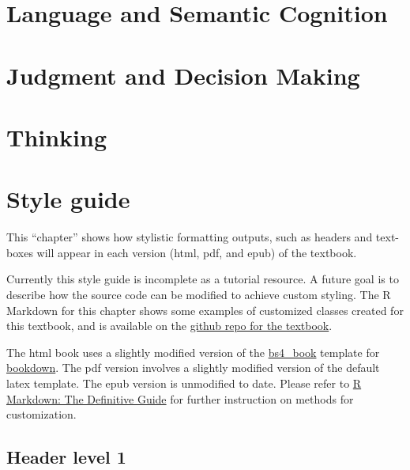 \documentclass[
  oneside,
  12pt]{crumpbook}
\begin{document}
\hypertarget{language-and-semantic-cognition}{%
\chapter{Language and Semantic Cognition}\label{language-and-semantic-cognition}}

\hypertarget{judgment-and-decision-making}{%
\chapter{Judgment and Decision Making}\label{judgment-and-decision-making}}

\hypertarget{thinking}{%
\chapter{Thinking}\label{thinking}}

\hypertarget{style-guide}{%
\chapter*{Style guide}\label{style-guide}}

This ``chapter'' shows how stylistic formatting outputs, such as headers and text-boxes will appear in each version (html, pdf, and epub) of the textbook.

Currently this style guide is incomplete as a tutorial resource. A future goal is to describe how the source code can be modified to achieve custom styling. The R Markdown for this chapter shows some examples of customized classes created for this textbook, and is available on the \href{https://github.com/CrumpLab/cognition/blob/main/textbook/Style_guide.Rmd}{github repo for the textbook}.

The html book uses a slightly modified version of the \href{https://pkgs.rstudio.com/bookdown/reference/bs4_book.html}{bs4\_book} template for \href{https://pkgs.rstudio.com/bookdown/index.html}{bookdown}. The pdf version involves a slightly modified version of the default latex template. The epub version is unmodified to date. Please refer to \href{https://bookdown.org/yihui/rmarkdown/}{R Markdown: The Definitive Guide} for further instruction on methods for customization.

\hypertarget{header-level-1}{%
\section{Header level 1}\label{header-level-1}}
\end{document}
